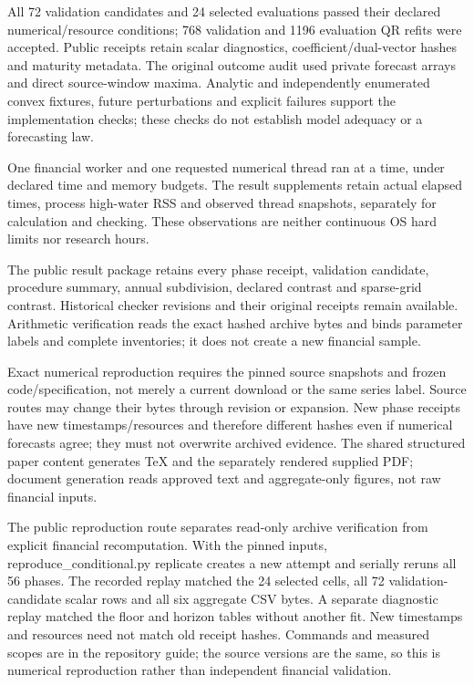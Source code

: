 \documentclass[10pt,a4paper]{article}
\begin{document}
All 72 validation candidates and 24 selected evaluations passed their declared numerical/resource conditions; 768 validation and 1196 evaluation QR refits were accepted. Public receipts retain scalar diagnostics, coefficient/dual-vector hashes and maturity metadata. The original outcome audit used private forecast arrays and direct source-window maxima. Analytic and independently enumerated convex fixtures, future perturbations and explicit failures support the implementation checks; these checks do not establish model adequacy or a forecasting law.

One financial worker and one requested numerical thread ran at a time, under declared time and memory budgets. The result supplements retain actual elapsed times, process high-water RSS and observed thread snapshots, separately for calculation and checking. These observations are neither continuous OS hard limits nor research hours.

The public result package retains every phase receipt, validation candidate, procedure summary, annual subdivision, declared contrast and sparse-grid contrast. Historical checker revisions and their original receipts remain available. Arithmetic verification reads the exact hashed archive bytes and binds parameter labels and complete inventories; it does not create a new financial sample.

Exact numerical reproduction requires the pinned source snapshots and frozen code/specification, not merely a current download or the same series label. Source routes may change their bytes through revision or expansion. New phase receipts have new timestamps/resources and therefore different hashes even if numerical forecasts agree; they must not overwrite archived evidence. The shared structured paper content generates TeX and the separately rendered supplied PDF; document generation reads approved text and aggregate-only figures, not raw financial inputs.

The public reproduction route separates read-only archive verification from explicit financial recomputation. With the pinned inputs, reproduce\_conditional.py replicate creates a new attempt and serially reruns all 56 phases. The recorded replay matched the 24 selected cells, all 72 validation-candidate scalar rows and all six aggregate CSV bytes. A separate diagnostic replay matched the floor and horizon tables without another fit. New timestamps and resources need not match old receipt hashes. Commands and measured scopes are in the repository guide; the source versions are the same, so this is numerical reproduction rather than independent financial validation.
\end{document}
